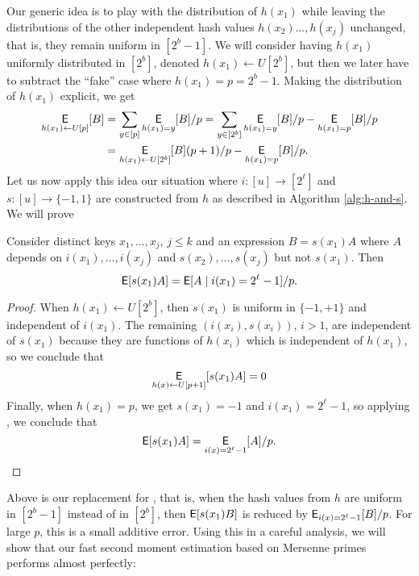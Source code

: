 Our generic idea is to play with the distribution of $h(x_1)$ while
leaving the distributions of the other independent hash values
$h(x_2)\ldots,h(x_j)$ unchanged, that is, they remain uniform in
$[2^b-1]$. We will consider having $h(x_1)$ uniformly distributed in
$[2^b]$, denoted $h(x_1)\gets U[2^b]$, but then we later have to
subtract the ``fake'' case where $h(x_1)=p=2^b-1$.  Making the
distribution of $h(x_1)$ explicit, we get
\begin{align}
   \operatorname*{\sf{E}}_{h(x_1)\gets U[p]}[B]&=\sum_{y\in[p]}\operatorname*{\sf{E}}_{h(x_1)=y}[B]/p
   =\sum_{y\in[2^b]}\operatorname*{\sf{E}}_{h(x_1)=y}[B]/p-\operatorname*{\sf{E}}_{h(x_1)=p}[B]/p\nonumber\\
                           &=\operatorname*{\sf{E}}_{h(x_1)\gets U[2^b]}[B](p+1)/p-\operatorname*{\sf{E}}_{h(x_1)=p}[B]/p.\label{eq:play-with-dist}
\end{align}
Let us now apply this idea our situation where $i:[u]\to[2^\ell]$ and
$s:[u]\to\{-1,1\}$ are constructed from $h$ as described in Algorithm
\ref{alg:h-and-s}. We will prove
\begin{lemma}\label{lem:remove-si}  Consider distinct keys $x_1,\ldots,x_j$, $j\leq k$ and an expression $B=s(x_1)A$ where $A$
   depends on $i(x_1),\ldots,i(x_j)$ and $s(x_2),\ldots,s(x_j)$ but not
   $s(x_1)$. Then
   \begin{equation}\label{eq:remove-si}
      \operatorname*{\sf{E}}[s(x_1)A]=\operatorname*{\sf{E}}[A\mid i(x_1)=2^\ell-1]/p.
   \end{equation}
\end{lemma}
\begin{proof}
   When $h(x_1)\gets U[2^b]$, then $s(x_1)$ is uniform
   in $\{-1,+1\}$ and independent of $i(x_1)$. The remaining
   $(i(x_i),s(x_i))$, $i>1$, are independent of $s(x_1)$ because they
   are functions of $h(x_i)$ which is independent of $h(x_1)$, so
   we conclude that 
   \[\operatorname*{\sf{E}}_{h(x)\gets U[p+1]}[s(x_1)A]=0\]
   Finally, when $h(x_1)=p$, we get $s(x_1)=-1$ and $i(x_1)=2^\ell-1$, 
   so applying , we conclude
   that 
   \[\operatorname*{\sf{E}}[s(x_1)A]=\operatorname*{\sf{E}}_{i(x)=2^\ell-1}[A]/p.\]
\end{proof}
Above  is our replacement for , that is,
when the hash values from $h$ are uniform in $[2^b-1]$ instead of
in $[2^b]$, then $\operatorname*{\sf{E}}[s(x_1)B]$ is reduced by $\operatorname*{\sf{E}}_{i(x)=2^\ell-1}[B]/p$.
For large $p$, this is a small additive error. Using this in a careful
analysis, we will show that our fast second moment estimation 
based on Mersenne primes performs almost perfectly:

